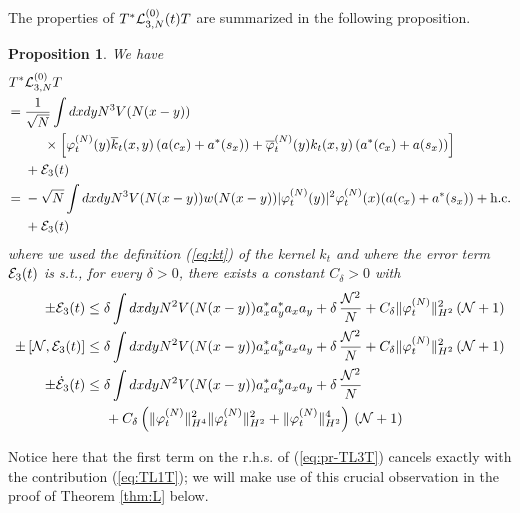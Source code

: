 \documentclass[11pt,a4paper]{article}
\newtheorem{proposition}[thm]{Proposition}
\newcommand{\cE}{{\cal E}}
\newcommand{\cL}{{\cal L}}
\newcommand{\cN}{{\cal N}}
\begin{document}
The properties of $T^* \cL_{3,N}^{(0)} (t) T$ are summarized in the following proposition. 
\begin{proposition}\label{prop:TL3T}
We have
\begin{equation}\label{eq:pr-TL3T} \begin{split} T^* &\cL^{(0)}_{3,N} T \\ =  \; & \frac{1}{\sqrt{N}} 
\int dx dy N^3 V (N (x-y))  \\ & \hspace{.5cm} \times \left[ \varphi_t^{(N)} (y) \overline{k}_t (x,y)  \left( a (c_x) + a^* (s_x) \right)   + \overline{\varphi}_t^{(N)} (y) k_t (x,y)  \left( a^* (c_x) + a (s_x) \right)  \right] \\ &+ \cE_3 (t) \\
= \; &- \sqrt{N} \int dx dy N^3 V(N (x-y)) w(N (x-y)) |\varphi_t^{(N)} (y)|^2 \varphi_t^{(N)} (x) (a (c_x) + a^* (s_x)) + \text{h.c.} \\ &+ \cE_3 (t)
\end{split} \end{equation}
where we used the definition (\ref{eq:kt}) of the kernel $k_t$ and where the error term $\cE_3 (t)$ is s.t., for every $\delta > 0$, there exists a constant $C_\delta > 0$ with
\begin{equation}\label{eq:TL3T-cl}
\begin{split} \pm \cE_3 (t)  &\leq \delta \int dx dy N^2 V (N (x-y)) a_x^* a_y^* a_x a_y + \delta \,\frac{\cN^2}{N} + C_\delta \| \varphi_t^{(N)} \|_{H^2}^2 \left(\cN + 1\right) \\
\pm \left[ \cN , \cE_3 (t) \right] &\leq \delta \int dx dy N^2 V (N (x-y)) a_x^* a_y^* a_x a_y + \delta \,  \frac{\cN^2}{N} + C_\delta  \| \varphi_t^{(N)} \|_{H^2}^2  \left(\cN + 1\right) \\
\pm \dot{\cE}_3 (t) & \leq \delta \int dx dy N^2 V (N (x-y)) a_x^* a_y^* a_x a_y + \delta \, \frac{\cN^2}{N} 
\\ & \hspace{.5cm} + C_\delta \left( \| \varphi_t^{(N)} \|_{H^4}^2 \| \varphi_t^{(N)} \|_{H^2}^2 + \| \varphi_t^{(N)} \|_{H^2}^4 \right) \,  \left( \cN + 1\right)
\end{split} \end{equation}
\end{proposition}

Notice here that the first term on the r.h.s. of (\ref{eq:pr-TL3T}) cancels exactly with the contribution (\ref{eq:TL1T}); we will make use of this crucial observation in the proof of Theorem \ref{thm:L} below.
\end{document}
